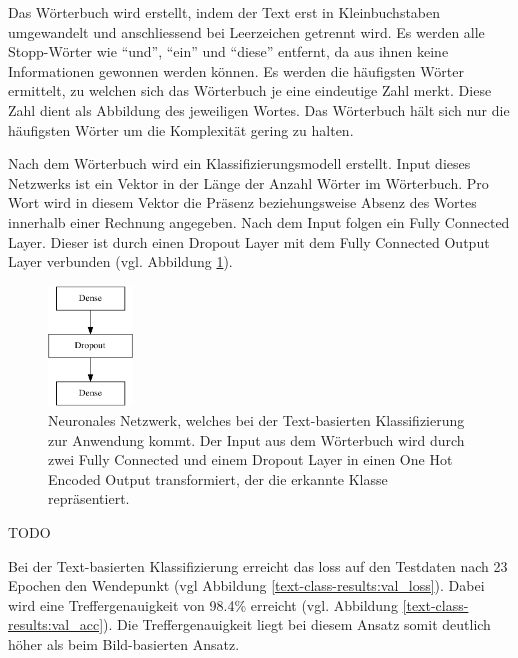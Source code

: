 Das Wörterbuch wird erstellt, indem der Text erst in Kleinbuchstaben umgewandelt und anschliessend bei Leerzeichen getrennt wird. Es werden alle Stopp-Wörter wie \enquote{und}, \enquote{ein} und \enquote{diese} entfernt, da aus ihnen keine Informationen gewonnen werden können. Es werden die häufigsten Wörter ermittelt, zu welchen sich das Wörterbuch je eine eindeutige Zahl merkt. Diese Zahl dient als Abbildung des jeweiligen Wortes. Das Wörterbuch hält sich nur die häufigsten Wörter um die Komplexität gering zu halten.

Nach dem Wörterbuch wird ein Klassifizierungsmodell erstellt. Input dieses Netzwerks ist ein Vektor in der Länge der Anzahl Wörter im Wörterbuch. Pro Wort wird in diesem Vektor die Präsenz beziehungsweise Absenz des Wortes innerhalb einer Rechnung angegeben. Nach dem Input folgen ein Fully Connected Layer. Dieser ist durch einen Dropout Layer mit dem Fully Connected Output Layer verbunden (vgl. Abbildung \ref{text-classification-model}). 

\begin{figure}[h]
    \caption{Neuronales Netzwerk, welches bei der Text-basierten Klassifizierung zur Anwendung kommt. Der Input aus dem Wörterbuch wird durch zwei Fully Connected und einem Dropout Layer in einen One Hot Encoded Output transformiert, der die erkannte Klasse repräsentiert.}
    \label{text-classification-model}
    \centering
    \includegraphics[width=0.2\textwidth]{graphics/text-classification/model.pdf}
\end{figure}



TODO



Bei der Text-basierten Klassifizierung erreicht das loss auf den Testdaten nach 23 Epochen den Wendepunkt (vgl Abbildung \ref{text-class-results:val_loss}). Dabei wird eine Treffergenauigkeit von 98.4\% erreicht (vgl. Abbildung \ref{text-class-results:val_acc}). Die Treffergenauigkeit liegt bei diesem Ansatz somit deutlich höher als beim Bild-basierten Ansatz.

